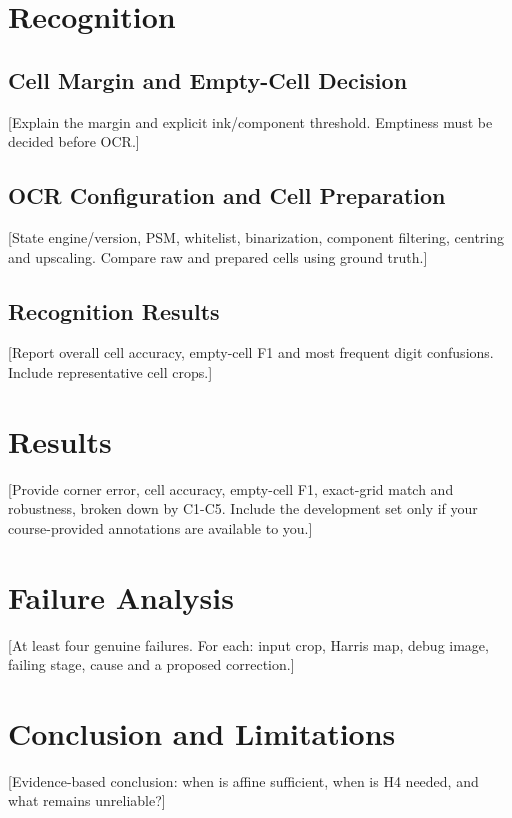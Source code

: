 \documentclass[conference]{IEEEtran}
\begin{document}
\section{Recognition}
\subsection{Cell Margin and Empty-Cell Decision}
[Explain the margin and explicit ink/component threshold. Emptiness must be decided before OCR.]
\subsection{OCR Configuration and Cell Preparation}
[State engine/version, PSM, whitelist, binarization, component filtering, centring and upscaling. Compare raw and prepared cells using ground truth.]
\subsection{Recognition Results}
[Report overall cell accuracy, empty-cell F1 and most frequent digit confusions. Include representative cell crops.]

\section{Results}
[Provide corner error, cell accuracy, empty-cell F1, exact-grid match and robustness, broken down by C1-C5. Include the development set only if your course-provided annotations are available to you.]

\section{Failure Analysis}
[At least four genuine failures. For each: input crop, Harris map, debug image, failing stage, cause and a proposed correction.]

\section{Conclusion and Limitations}
[Evidence-based conclusion: when is affine sufficient, when is H4 needed, and what remains unreliable?]

\appendices
\end{document}
